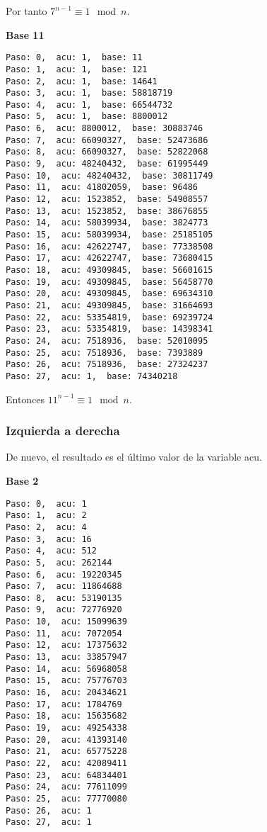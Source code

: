 \documentclass[a4paper]{article}
\begin{document}
Por tanto $7^{n-1}\equiv 1 \mod n$.

\textbf{Base 11}
\begin{verbatim}
Paso: 0,  acu: 1,  base: 11  
Paso: 1,  acu: 1,  base: 121  
Paso: 2,  acu: 1,  base: 14641  
Paso: 3,  acu: 1,  base: 58818719  
Paso: 4,  acu: 1,  base: 66544732  
Paso: 5,  acu: 1,  base: 8800012  
Paso: 6,  acu: 8800012,  base: 30883746  
Paso: 7,  acu: 66090327,  base: 52473686  
Paso: 8,  acu: 66090327,  base: 52822068  
Paso: 9,  acu: 48240432,  base: 61995449  
Paso: 10,  acu: 48240432,  base: 30811749  
Paso: 11,  acu: 41802059,  base: 96486  
Paso: 12,  acu: 1523852,  base: 54908557  
Paso: 13,  acu: 1523852,  base: 38676855  
Paso: 14,  acu: 58039934,  base: 3824773  
Paso: 15,  acu: 58039934,  base: 25185105  
Paso: 16,  acu: 42622747,  base: 77338508  
Paso: 17,  acu: 42622747,  base: 73680415  
Paso: 18,  acu: 49309845,  base: 56601615  
Paso: 19,  acu: 49309845,  base: 56458770  
Paso: 20,  acu: 49309845,  base: 69634310  
Paso: 21,  acu: 49309845,  base: 31664693  
Paso: 22,  acu: 53354819,  base: 69239724  
Paso: 23,  acu: 53354819,  base: 14398341  
Paso: 24,  acu: 7518936,  base: 52010095  
Paso: 25,  acu: 7518936,  base: 7393889  
Paso: 26,  acu: 7518936,  base: 27324237  
Paso: 27,  acu: 1,  base: 74340218  
\end{verbatim}

Entonces $11^{n-1}\equiv 1 \mod n$.

\subsubsection{Izquierda a derecha}

De nuevo, el resultado es el último valor de la variable acu.

\textbf{Base 2}
\begin{verbatim}
Paso: 0,  acu: 1
Paso: 1,  acu: 2
Paso: 2,  acu: 4
Paso: 3,  acu: 16
Paso: 4,  acu: 512
Paso: 5,  acu: 262144
Paso: 6,  acu: 19220345
Paso: 7,  acu: 11864688
Paso: 8,  acu: 53190135
Paso: 9,  acu: 72776920
Paso: 10,  acu: 15099639
Paso: 11,  acu: 7072054
Paso: 12,  acu: 17375632
Paso: 13,  acu: 33857947
Paso: 14,  acu: 56968058
Paso: 15,  acu: 75776703
Paso: 16,  acu: 20434621
Paso: 17,  acu: 1784769
Paso: 18,  acu: 15635682
Paso: 19,  acu: 49254338
Paso: 20,  acu: 41393140
Paso: 21,  acu: 65775228
Paso: 22,  acu: 42089411
Paso: 23,  acu: 64834401
Paso: 24,  acu: 77611099
Paso: 25,  acu: 77770080
Paso: 26,  acu: 1
Paso: 27,  acu: 1
\end{verbatim}
\end{document}
